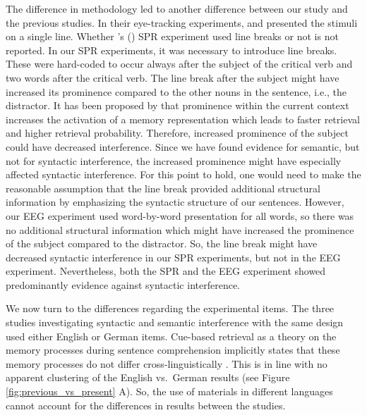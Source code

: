 \documentclass[review,preprint,12pt,authoryear,floatsintext]{elsarticle}
\begin{document}
{{The difference in methodology led to another difference between our study and the previous studies. In their eye-tracking experiments, \cite{vandyke07} and \cite{mertzen} presented the stimuli on a single line. Whether \citeauthor{vandyke07}'s (\citeyear{vandyke07}) SPR experiment used line breaks or not is not reported. In our SPR experiments, it was necessary to introduce line breaks. These were hard-coded to occur always after the subject of the critical verb and two words after the critical verb. The line break after the subject might have increased its prominence compared to the other nouns in the sentence, i.e., the distractor. It has been proposed by \cite{engelmann_etal_2019} that prominence within the current context increases the activation of a memory representation which leads to faster retrieval and higher retrieval probability. Therefore, increased prominence of the subject could have decreased interference. Since we have found evidence for semantic, but not for syntactic interference, the increased prominence might have especially affected syntactic interference. For this point to hold, one would need to make the reasonable assumption that the line break provided additional structural information by emphasizing the syntactic structure of our sentences. However, our EEG experiment used word-by-word presentation for all words, so there was no additional structural information which might have increased the prominence of the subject compared to the distractor. So, the line break might have decreased syntactic interference in our SPR experiments, but not in the EEG experiment. Nevertheless, both the SPR and the EEG experiment showed predominantly evidence against syntactic interference.
}\label{linebreak}

We now turn to the differences regarding the experimental items. The three studies investigating syntactic and semantic interference with the same design used either English or German items. Cue-based retrieval as a theory on the memory processes during sentence comprehension implicitly states that these memory processes do not differ cross-linguistically \citep{lewis06, Lewis2005}. This is in line with no apparent clustering of the English vs.\ German results (see Figure \ref{fig:previous_vs_present} A). So, the use of materials in different languages cannot account for the differences in results between the studies.

}
\end{document}
